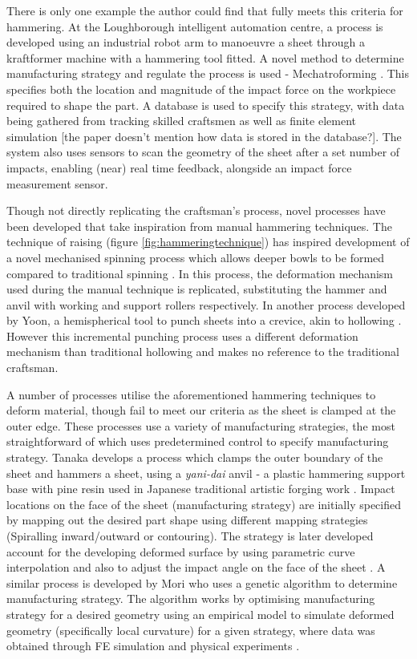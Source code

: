 There is only one example the author could find that fully meets this criteria for hammering. At the Loughborough intelligent automation centre, a process is developed using an industrial robot arm to manoeuvre a sheet through a kraftformer machine with a hammering tool fitted. A novel method to determine manufacturing strategy and regulate the process is used - Mechatroforming \citep{Ilangovan2016AnForming}. This specifies both the location and magnitude of the impact force on the workpiece required to shape the part. A database is used to specify this strategy, with data being gathered from tracking skilled craftsmen as well as finite element simulation [the paper doesn't mention how data is stored in the database?]. The system also uses sensors to scan the geometry of the sheet after a set number of impacts, enabling (near) real time feedback, alongside an impact force measurement sensor.

Though not directly replicating the craftsman's process, novel processes have been developed that take inspiration from manual hammering techniques. The technique of raising (figure \ref{fig:hammeringtechnique}) has inspired development of a novel mechanised spinning process which allows deeper bowls to be formed compared to traditional spinning \citep{Russo2020RaisingSpinning}. In this process, the deformation mechanism used during the manual technique is replicated, substituting the hammer and anvil with working and support rollers respectively. In another process developed by Yoon, a hemispherical tool to punch sheets into a crevice, akin to hollowing \citep{Yoon2001InvestigationMetal}. However this incremental punching process uses a different deformation mechanism than traditional hollowing and makes no reference to the traditional craftsman.

A number of processes utilise the aforementioned hammering techniques to deform material, though fail to meet our criteria as the sheet is clamped at the outer edge. These processes use a variety of manufacturing strategies, the most straightforward of which uses predetermined control to specify manufacturing strategy. Tanaka develops a process which clamps the outer boundary of the sheet and hammers a sheet, using a \textit{yani-dai} anvil - a plastic hammering support base with pine resin used in Japanese traditional artistic forging work \citep{Tanaka2005DevelopmentWorking}. Impact locations on the face of the sheet (manufacturing strategy) are initially specified by mapping out the desired part shape using different mapping strategies (Spiralling inward/outward or contouring). The strategy is later developed account for the developing deformed surface by using parametric curve interpolation \citep{Asakawa2010DevelopmentProcess} and also to adjust the impact angle on the face of the sheet \citep{Takasugi2012DevelopmentShape}. A similar process is developed by Mori who uses a genetic algorithm to determine manufacturing strategy. The algorithm works by optimising manufacturing strategy for a desired geometry using an empirical model to simulate deformed geometry (specifically local curvature) for a given strategy, where data was obtained through FE simulation and physical experiments \citep{Mori1996DeterminationAlgorithm}. 

